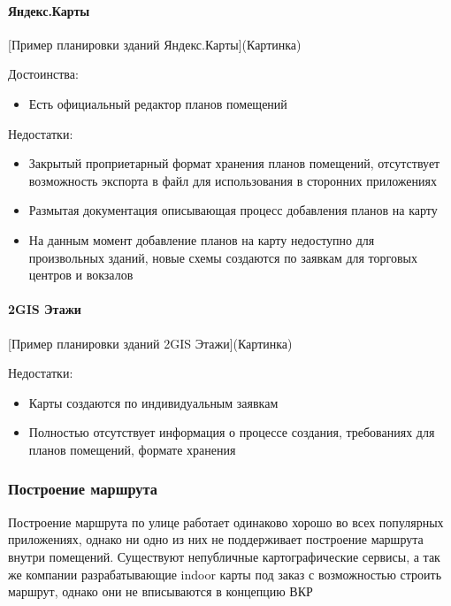      \paragraph{Яндекс.Карты}
        [Пример планировки зданий Яндекс.Карты](Картинка)

        \noindent Достоинства:
        \begin{itemize}
          \item Есть официальный редактор планов помещений
        \end{itemize}

        \noindent Недостатки:
        \begin{itemize}
          \item Закрытый проприетарный формат хранения планов помещений, отсутствует возможность экспорта в файл для использования в сторонних приложениях
          \item Размытая документация описывающая процесс добавления планов на карту
          \item На данным момент добавление планов на карту недоступно для произвольных зданий, новые схемы создаются по заявкам для торговых центров и вокзалов
        \end{itemize}


      \paragraph{2GIS Этажи}
        [Пример планировки зданий 2GIS Этажи](Картинка)

        \noindent Недостатки:
        \begin{itemize}
          \item Карты создаются по индивидуальным заявкам
          \item Полностью отсутствует информация о процессе создания, требованиях для планов помещений, формате хранения
        \end{itemize}

    \subsubsection{Построение маршрута}
      Построение маршрута по улице работает одинаково хорошо во всех популярных приложениях, однако ни одно из них не поддерживает построение маршрута внутри помещений. Существуют непубличные картографические сервисы, а так же компании разрабатывающие indoor карты под заказ с возможностью строить маршрут, однако они не вписываются в концепцию ВКР


